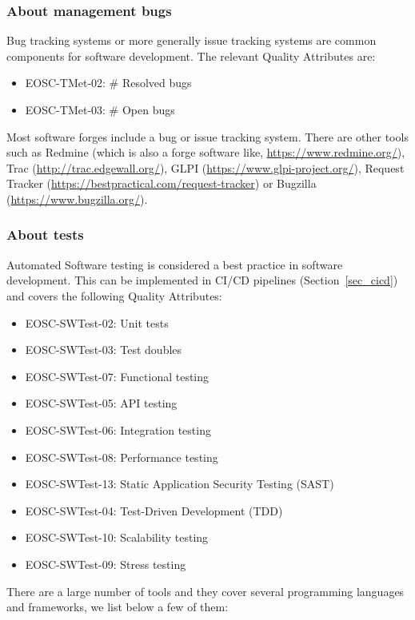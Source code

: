 \subsubsection{About management bugs}

Bug tracking systems or more generally issue tracking systems are common components for software development. The relevant Quality Attributes are:

\begin{itemize}
  \item EOSC-TMet-02: \# Resolved bugs
  \item EOSC-TMet-03: \# Open bugs
\end{itemize}

Most software forges include a bug or issue tracking system. There are other tools such as Redmine (which is also a forge software like, \url{https://www.redmine.org/}), Trac (\url{http://trac.edgewall.org/}), GLPI (\url{https://www.glpi-project.org/}), Request Tracker (\url{https://bestpractical.com/request-tracker}) or Bugzilla (\url{https://www.bugzilla.org/}).

\subsubsection{About tests}

Automated Software testing is considered a best practice in software development. This can be implemented in CI/CD pipelines (Section~\ref{sec_cicd}) and covers the following Quality Attributes:

\begin{itemize}
  \item EOSC-SWTest-02: Unit tests
  \item EOSC-SWTest-03: Test doubles
  \item EOSC-SWTest-07: Functional testing
  \item EOSC-SWTest-05: API testing
  \item EOSC-SWTest-06: Integration testing
  \item EOSC-SWTest-08: Performance testing
  \item EOSC-SWTest-13: Static Application Security Testing (SAST)
  \item EOSC-SWTest-04: Test-Driven Development (TDD)
  \item EOSC-SWTest-10: Scalability testing
  \item EOSC-SWTest-09: Stress testing
\end{itemize}

There are a large number of tools and they cover several programming languages and frameworks, we list below a few of them:

